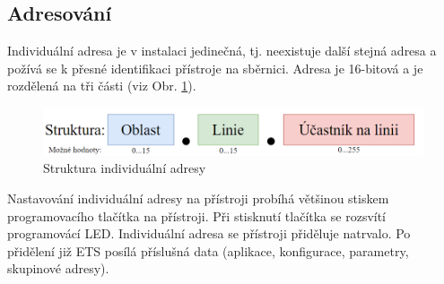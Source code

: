 \subsection{Adresování}
\label{Adresování}
Individuální adresa je v instalaci jedinečná, tj. neexistuje další stejná adresa a požívá se k přesné identifikaci přístroje na sběrnici. Adresa je 16-bitová a je rozdělená na tři části (viz Obr. \ref{fig:Struktura individuální adresy]}).
\begin{figure}[!h]
  \begin{center}
    \includegraphics[scale=0.6]{obrazky/Adresovani.png}
  \end{center}
  \caption[Struktura individuální adresy \cite{Celkovy prehled)}]{Struktura individuální adresy \cite{Celkovy prehled}}
  \label{fig:Struktura individuální adresy]}
\end{figure}

Nastavování individuální adresy na přístroji probíhá většinou stiskem programovacího tlačítka na přístroji. Při stisknutí tlačítka se rozsvítí programovácí LED. Individuální adresa se přístroji přiděluje natrvalo. Po přidělení již ETS posílá příslušná data (aplikace, konfigurace, parametry, skupinové adresy).


